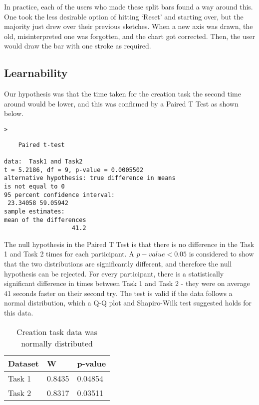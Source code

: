 In practice, each of the users who made these split bars found a way around this. One took the less desirable option of hitting `Reset' and starting over, but the majority just drew over their previous sketches. When a new axis was drawn, the old, misinterpreted one was forgotten, and the chart got corrected. Then, the user would draw the bar with one stroke as required.

\subsection{Learnability}
Our hypothesis was that the time taken for the creation task the second time around would be lower, and this was confirmed by a Paired T Test as shown below.

\begin{alltt}
>   \hlstd{=} \hlstd{)}
\end{alltt}
\begin{verbatim} 
	Paired t-test

data:  Task1 and Task2
t = 5.2186, df = 9, p-value = 0.0005502
alternative hypothesis: true difference in means 
is not equal to 0
95 percent confidence interval:
 23.34058 59.05942
sample estimates:
mean of the differences 
                   41.2 
\end{verbatim}


The null hypothesis in the Paired T Test is that there is no difference in the Task 1 and Task 2 times for each participant. A $p-value < 0.05$ is considered to show that the two distributions are significantly different, and therefore the null hypothesis can be rejected. For every participant, there is a statistically significant difference in times between Task 1 and Task 2 - they were on average 41 seconds faster on their second try. The test is valid if the data follows a normal distribution, which a Q-Q plot and Shapiro-Wilk test suggested holds for this data.

\begin{table}[H]
\begin{center}
\setlength{\tabcolsep}{8pt} 
\renewcommand{\arraystretch}{1.5}


\begin{tabular}{l | l l}
Dataset & W & p-value \\ \hline
Task 1 & 0.8435 & 0.04854 \\
Task 2 & 0.8317 & 0.03511 \\
\end{tabular}
\end{center}
\caption{Creation task data was normally distributed}
\end{table}


